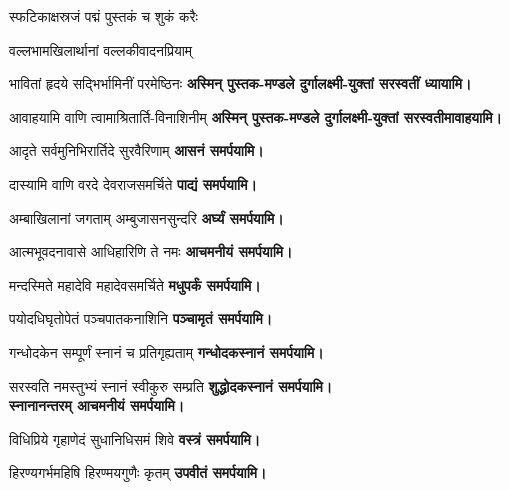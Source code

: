 \begin{center}

{स्फटिकाक्षस्रजं पद्मं पुस्तकं च शुकं करैः}

{वल्लभामखिलार्थानां वल्लकीवादनप्रियाम्}

{भावितां हृदये सद्भिर्भामिनीं परमेष्ठिनः}
\textbf{अस्मिन् पुस्तक-मण्डले दुर्गालक्ष्मी-युक्तां सरस्वतीं ध्यायामि।}
\medskip

{आवाहयामि वाणि त्वामाश्रितार्ति-विनाशिनीम्}
\textbf{अस्मिन् पुस्तक-मण्डले दुर्गालक्ष्मी-युक्तां सरस्वतीमावाहयामि।}
\medskip

{आदृते सर्वमुनिभिरार्तिदे सुरवैरिणाम् }
\textbf{\devAya{} आसनं समर्पयामि।}
\medskip

{दास्यामि वाणि वरदे देवराजसमर्चिते}
\textbf{\devAya{} पाद्यं समर्पयामि।}
\medskip

{अम्बाखिलानां जगताम् अम्बुजासनसुन्दरि}
\textbf{\devAya{} अर्घ्यं समर्पयामि।}
\medskip

{आत्मभूवदनावासे आधिहारिणि ते नमः}
\textbf{\devAya{} आचमनीयं समर्पयामि।}
\medskip

{मन्दस्मिते महादेवि महादेवसमर्चिते}
\textbf{\devAya{} मधुपर्कं समर्पयामि।}
\medskip

{पयोदधिघृतोपेतं पञ्चपातकनाशिनि}
\textbf{\devAya{} पञ्चामृतं समर्पयामि।}
\medskip

{गन्धोदकेन सम्पूर्णं स्नानं च प्रतिगृह्यताम्}
\textbf{\devAya{} गन्धोदकस्नानं समर्पयामि।}\footnotemark
\medskip

{सरस्वति नमस्तुभ्यं स्नानं स्वीकुरु सम्प्रति}
\textbf{\devAya{} शुद्धोदकस्नानं समर्पयामि।\\
स्नानानन्तरम् आचमनीयं समर्पयामि।}
\medskip

{विधिप्रिये गृहाणेदं सुधानिधिसमं शिवे}
\textbf{\devAya{} वस्त्रं समर्पयामि।}
\medskip

{हिरण्यगर्भमहिषि हिरण्मयगुणैः कृतम्}
\textbf{\devAya{} उपवीतं समर्पयामि।}
\medskip


\end{center}
